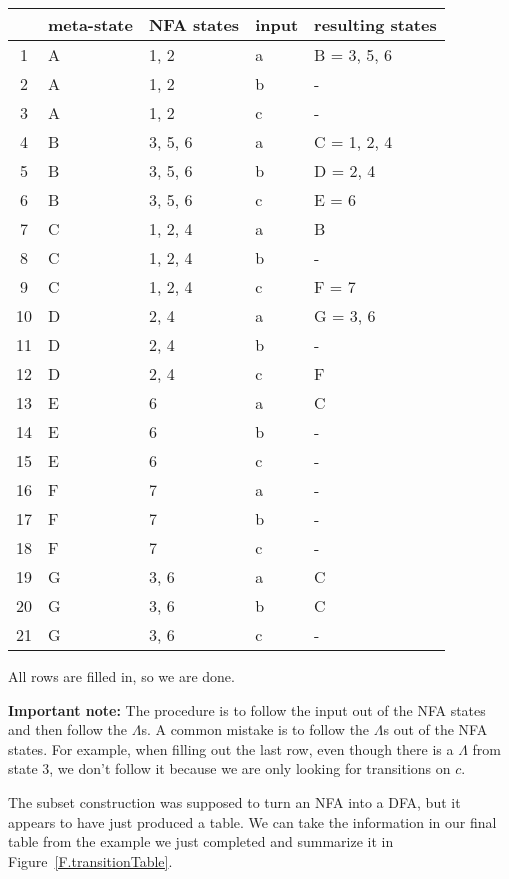 \documentclass[letterpaper,12pt,openany,reqno]{book}%
\begin{document}
\begin{center}
\small
\begin{tabular}{c|l|l|l|l}
\hline
& \textbf{meta-state} & \textbf{NFA states} & \textbf{input} & \textbf{resulting states} \\
\hline
1 & A & 1, 2 & a & B = 3, 5, 6 \\
2 & A & 1, 2 & b & - \\
3 & A & 1, 2 & c & - \\
4 & B & 3, 5, 6 & a & C = 1, 2, 4 \\
5 & B & 3, 5, 6 & b & D = 2, 4 \\
6 & B & 3, 5, 6 & c & E = 6 \\
7 & C & 1, 2, 4 & a & B\\
8 & C & 1, 2, 4 & b & -\\
9 & C & 1, 2, 4 & c & F = 7 \\
10 & D & 2, 4 & a & G = 3, 6\\
11 & D & 2, 4 & b & - \\
12 & D & 2, 4 & c & F \\
13 & E & 6 & a & C\\
14 & E & 6 & b & - \\
15 & E & 6 & c & - \\
16 & F & 7 & a & - \\
17 & F & 7 & b & - \\
18 & F & 7 & c & - \\
19 & G & 3, 6 & a & C \\
20 & G & 3, 6 & b & C\\
21 & G & 3, 6 & c & - \\
\hline
\end{tabular}
\end{center}

All rows are filled in, so we are done.

\textbf{Important note:} The procedure is to follow the input out of the NFA states and then follow the $\Lambda$s. A common mistake is to follow the $\Lambda$s out of the NFA states. For example, when filling out the last row, even though there is a $\Lambda$ from state 3, we don't follow it because we are only looking for transitions on $c$.

The subset construction was supposed to turn an NFA into a DFA, but it appears to have just produced a table. We can take the information in our final table from the example we just completed and summarize it in Figure~\ref{F.transitionTable}.
\end{document}

